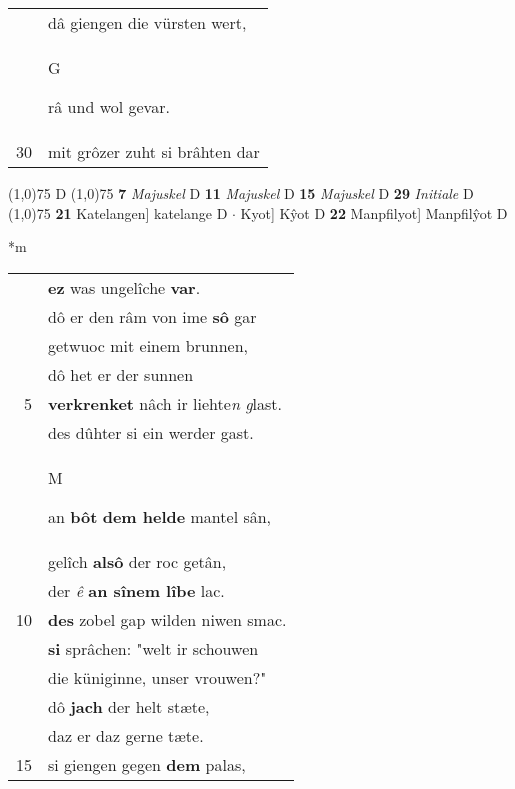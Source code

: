 \documentclass[8pt,a4paper,notitlepage]{article}
\begin{document}
\begin{table}[ht]
\begin{minipage}[t]{0.5\linewidth}
\begin{tabular}{rl}
 & dâ giengen die vürsten wert,\\ 
 & \begin{large}G\end{large}râ und wol gevar.\\ 
30 & mit grôzer zuht si brâhten dar\\ 
\end{tabular}
\scriptsize
\line(1,0){75} \newline
D \newline
\line(1,0){75} \newline
\textbf{7} \textit{Majuskel} D  \textbf{11} \textit{Majuskel} D  \textbf{15} \textit{Majuskel} D  \textbf{29} \textit{Initiale} D  \newline
\line(1,0){75} \newline
\textbf{21} Katelangen] katelange D  $\cdot$ Kyot] Kŷot D \textbf{22} Manpfilyot] Manpfilŷot D \newline
\end{minipage}
\hspace{0.5cm}
\begin{minipage}[t]{0.5\linewidth}
\small
\begin{center}*m
\end{center}
\begin{tabular}{rl}
 & \textbf{ez} was ungelîche \textbf{var}.\\ 
 & dô er den râm von ime \textbf{sô} gar\\ 
 & getwuoc mit einem brunnen,\\ 
 & dô het er der sunnen\\ 
5 & \textbf{verkrenket} nâch ir liehte\textit{n} \textit{g}last.\\ 
 & des dûhter si ein werder gast.\\ 
 & \begin{large}M\end{large}an \textbf{bôt} \textbf{dem helde} mantel sân,\\ 
 & gelîch \textbf{alsô} der roc getân,\\ 
 & der \textit{ê} \textbf{an sînem lîbe} lac.\\ 
10 & \textbf{des} zobel gap wilden niwen smac.\\ 
 & \textbf{si} sprâchen: "welt ir schouwen\\ 
 & die küniginne, unser vrouwen?"\\ 
 & dô \textbf{jach} der helt stæte,\\ 
 & daz er daz gerne tæte.\\ 
15 & si giengen gegen \textbf{dem} palas,\\ 

\end{tabular}
\end{minipage}
\end{table}
\end{document}
